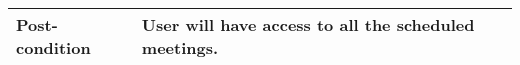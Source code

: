 \begin{table}[]
\begin{tabular}{|l|p{5cm}p{5cm}|}
        {\color[HTML]{231F20} \textbf{Post-condition}}                                                  & \multicolumn{2}{l|}{{\color[HTML]{231F20} User   will have access to all the scheduled meetings.}}                                                                                                                                                                                                        \\ \hline
    \end{tabular}
\end{table}